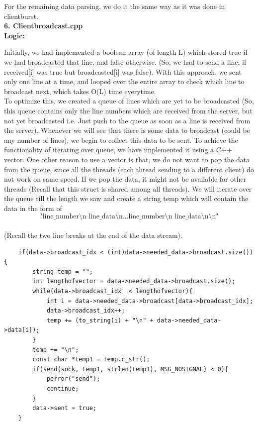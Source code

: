 \documentclass[12pt]{scrartcl}
\begin{document}
For the remaining data parsing, we do it the same way as it was done in clientburst.\\

\textbf{6. Clientbroadcast.cpp}\\

\textbf{Logic:} \\

\par Initially, we had implemented a boolean array (of length L) which stored true if we had broadcasted that line, and false otherwise. (So, we had to send a line, if received[i] was true but broadcasted[i] was false). With this approach, we sent only one line at a time, and looped over the entire array to check which line to broadcast next, which takes O(L) time everytime. \\

To optimize this, we created a queue of lines which are yet to be broadcasted (So, this queue contains only the line numbers which are received from the server, but not yet broadcasted i.e. Just push to the queue as soon as a line is received from the server). Whenever we will see that there is some data to broadcast (could be any number of lines), we begin to collect this data to be sent. To achieve the functionality of iterating over queue, we have implemented it using a C++ vector. One other reason to use a vector is that, we do not want to pop the data from the queue, since all the threads (each thread sending to a different client) do not work on same speed. If we pop the data, it might not be available for other threads (Recall that this struct is shared among all threads). We will iterate over the queue till the length we saw and create a string temp which will contain the data in the form of \[\mbox{"line\_number\textbackslash n line\_data\textbackslash n...line\_number\textbackslash n line\_data\textbackslash n\textbackslash n"}\]\\

(Recall the two line breaks at the end of the data stream). 

\begin{verbatim}
    if(data->broadcast_idx < (int)data->needed_data->broadcast.size()){
        string temp = "";
        int lengthofvector = data->needed_data->broadcast.size();
        while(data->broadcast_idx  < lengthofvector){
            int i = data->needed_data->broadcast[data->broadcast_idx];
            data->broadcast_idx++;
            temp += (to_string(i) + "\n" + data->needed_data->data[i]);
        }
        temp += "\n";
        const char *temp1 = temp.c_str();
        if(send(sock, temp1, strlen(temp1), MSG_NOSIGNAL) < 0){
            perror("send");
            continue;
        }
        data->sent = true;
    }
\end{verbatim}
\end{document}
